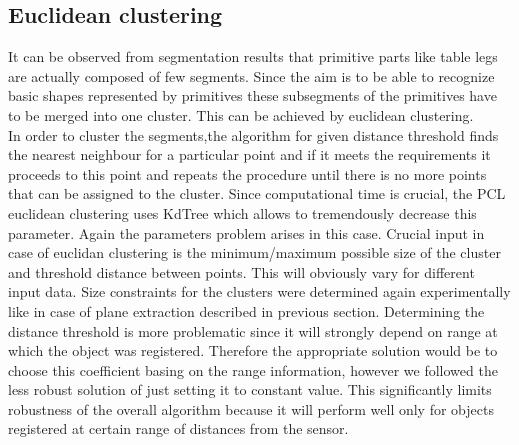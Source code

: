\documentclass[fontsize=12pt]{article}
\begin{document}
\subsection{Euclidean clustering}
\indent It can be observed from segmentation results that primitive parts like table legs are actually composed of few segments. Since the aim is to be able to recognize basic shapes represented by primitives these subsegments of the primitives have to be merged into one cluster. This can be achieved by euclidean clustering.\\
\newline
\indent In order to cluster the segments,the algorithm for given distance threshold finds the nearest neighbour for a particular point and if it meets the requirements it proceeds to this point and repeats the procedure until there is no more points that can be assigned to the cluster. Since computational time is crucial, the PCL euclidean clustering uses KdTree which allows to tremendously decrease this parameter. 
Again the parameters problem arises in this case. Crucial input in case of euclidan clustering is the minimum/maximum possible size of the cluster and threshold distance between points. This will obviously vary for different input data. Size constraints for the clusters were determined again experimentally like in case of plane extraction described in previous section. Determining the distance threshold is more problematic since it will strongly depend on range at which the object was registered. Therefore the appropriate solution would be to choose this coefficient basing on the range information, however we followed the less robust solution of just setting it to constant value. This significantly limits robustness of the overall algorithm because it will perform well only for objects registered at certain range of distances from the sensor. 
\end{document}
